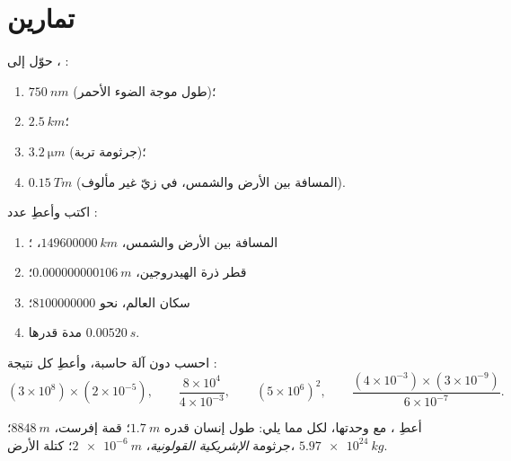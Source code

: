 \section{تمارين}

\begin{exercise}[$\star$]\label{exo:g10:orders-of-magnitude:1}
حوّل إلى ، :
\begin{enumerate}
  \item $\qty{750}{nm}$ (طول موجة الضوء الأحمر)؛
  \item $\qty{2.5}{km}$؛
  \item $\qty{3.2}{\micro m}$ (جرثومة تربة)؛
  \item $\qty{0.15}{Tm}$ (المسافة بين الأرض والشمس، في زيّ
        غير مألوف).
\end{enumerate}
\end{exercise}

\begin{exercise}[$\star$]\label{exo:g10:orders-of-magnitude:2}
اكتب  وأعطِ عدد :
\begin{enumerate}
  \item المسافة بين الأرض والشمس، $\qty{149600000}{km}$، ؛
  \item قطر ذرة الهيدروجين، $\qty{0.000000000106}{m}$؛
  \item سكان العالم، نحو $\num{8100000000}$؛
  \item مدة قدرها $\qty{0.00520}{s}$.
\end{enumerate}
\end{exercise}

\begin{exercise}[$\star$]\label{exo:g10:orders-of-magnitude:3}
احسب دون آلة حاسبة، وأعطِ كل نتيجة :
\[
(3\times10^{8})\times(2\times10^{-5}), \qquad
\frac{8\times10^{4}}{4\times10^{-3}}, \qquad
(5\times10^{6})^{2}, \qquad
\frac{(4\times10^{-3})\times(3\times10^{-9})}{6\times10^{-7}} .
\]
\end{exercise}

\begin{exercise}[$\star$]\label{exo:g10:orders-of-magnitude:4}
أعطِ ، مع وحدتها، لكل مما يلي: طول إنسان قدره
$\qty{1.7}{m}$؛ قمة إفرست، $\qty{8848}{m}$؛ جرثومة
\emph{الإشريكية القولونية}، $\qty{2e-6}{m}$؛ كتلة الأرض،
$\qty{5.97e24}{kg}$.
\end{exercise}

